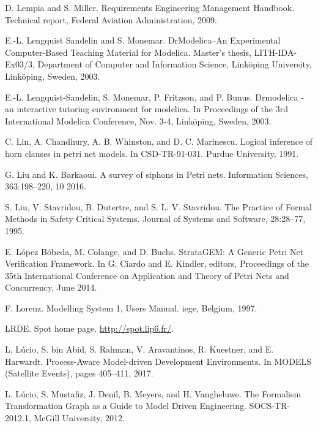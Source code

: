\begin{description}[style=nextline,leftmargin=12mm,labelwidth=10mm,font=\normalfont]
\item[{[184]}] D. Lempia and S. Miller. Requirements Engineering Management Handbook. Technical report, Federal Aviation Administration, 2009.

\item[{[185]}] E.-L. Lengquist Sandelin and S. Monemar. DrModelica–An Experimental Computer-Based Teaching Material for Modelica. Master’s thesis, LITH-IDA-Ex03/3, Department of Computer and Information Science, Linköping University, Linköping, Sweden, 2003.

\item[{[186]}] E.-L. Lengquist-Sandelin, S. Monemar, P. Fritzson, and P. Bunus. Drmodelica - an interactive tutoring environment for modelica. In Proceedings of the 3rd International Modelica Conference, Nov. 3-4, Linköping, Sweden, 2003.

\item[{[187]}] C. Lin, A. Chandhury, A. B. Whinston, and D. C. Marinescu. Logical inference of horn clauses in petri net models. In CSD-TR-91-031. Purdue University, 1991.

\item[{[188]}] G. Liu and K. Barkaoui. A survey of siphons in Petri nets. Information Sciences, 363:198–220, 10 2016.

\item[{[189]}] S. Liu, V. Stavridou, B. Dutertre, and S. L. V. Stavridou. The Practice of Formal Methods in Safety Critical Systems. Journal of Systems and Software, 28:28–77, 1995.

\item[{[190]}] E. López Bóbeda, M. Colange, and D. Buchs. StrataGEM: A Generic Petri Net Verification Framework. In G. Ciardo and E. Kindler, editors, Proceedings of the 35th International Conference on Application and Theory of Petri Nets and Concurrency, June 2014.

\item[{[191]}] F. Lorenz. Modelling System 1, Users Manual. iege, Belgium, 1997.

\item[{[192]}] LRDE. Spot home page. \url{http://spot.lip6.fr/}.

\item[{[193]}] L. Lúcio, S. bin Abid, S. Rahman, V. Aravantinos, R. Kuestner, and E. Harwardt. Process-Aware Model-driven Development Environments. In MODELS (Satellite Events), pages 405–411, 2017.

\item[{[194]}] L. Lúcio, S. Mustafiz, J. Denil, B. Meyers, and H. Vangheluwe. The Formalism Transformation Graph as a Guide to Model Driven Engineering. SOCS-TR-2012.1, McGill University, 2012.


\end{description}

